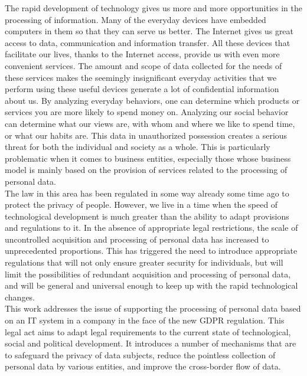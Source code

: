 \documentclass[en, noamssymb]{mgr}
\begin{document}
The rapid development of technology gives us more and more opportunities in the processing of information. Many of the everyday devices have embedded computers in them so that they can serve us better. The Internet gives us great access to data, communication and information transfer. All these devices that facilitate our lives, thanks to the Internet access, provide us with even more convenient services. The amount and scope of data collected for the needs of these services makes the seemingly insignificant everyday activities that we perform using these useful devices generate a lot of confidential information about us. By analyzing everyday behaviors, one can determine which products or services you are more likely to spend money on. Analyzing our social behavior can determine what our views are, with whom and where we like to spend time, or what our habits are. This data in unauthorized possession creates a serious threat for both the individual and society as a whole. This is particularly problematic when it comes to business entities, especially those whose business model is mainly based on the provision of services related to the processing of personal data.\\
\indent The law in this area has been regulated in some way already some time ago to protect the privacy of people. However, we live in a time when the speed of technological development is much greater than the ability to adapt provisions and regulations to it. In the absence of appropriate legal restrictions, the scale of uncontrolled acquisition and processing of personal data has increased to unprecedented proportions. This has triggered the need to introduce appropriate regulations that will not only ensure greater security for individuals, but will limit the possibilities of redundant acquisition and processing of personal data, and will be general and universal enough to keep up with the rapid technological changes.\\
\indent This work addresses the issue of supporting the processing of personal data based on an IT system in a company in the face of the new GDPR regulation. This legal act aims to adapt legal requirements to the current state of technological, social and political development. It introduces a number of mechanisms that are to safeguard the privacy of data subjects, reduce the pointless collection of personal data by various entities, and improve the cross-border flow of data.\\
\end{document}
